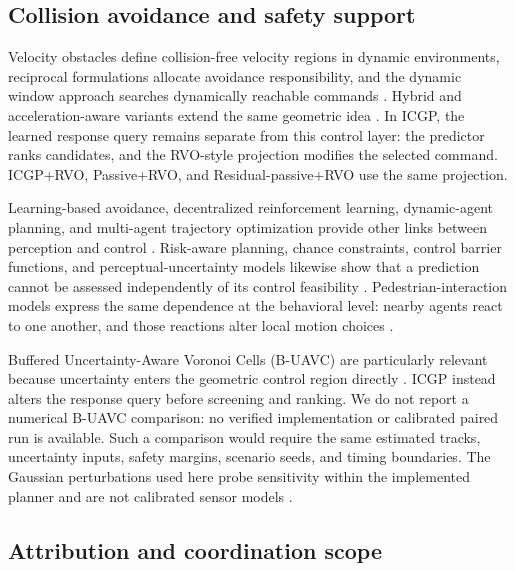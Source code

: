 \documentclass[pdflatex,sn-mathphys-num]{sn-jnl}
\begin{document}
\subsection{Collision avoidance and safety support}

Velocity obstacles define collision-free velocity regions in dynamic environments, reciprocal formulations allocate avoidance responsibility, and the dynamic window approach searches dynamically reachable commands \cite{fiorini1998,vandenberg2011,fox1997}. Hybrid and acceleration-aware variants extend the same geometric idea \cite{rvo2008,hrvo2009,avobstacles2011}. In ICGP, the learned response query remains separate from this control layer: the predictor ranks candidates, and the RVO-style projection modifies the selected command. ICGP+RVO, Passive+RVO, and Residual-passive+RVO use the same projection.

Learning-based avoidance, decentralized reinforcement learning, dynamic-agent planning, and multi-agent trajectory optimization provide other links between perception and control \cite{fan2020,behavior2014,long2018decentralized,everett2018dynamic,everett2021collision,kahn2018self,mader2022}. Risk-aware planning, chance constraints, control barrier functions, and perceptual-uncertainty models likewise show that a prediction cannot be assessed independently of its control feasibility \cite{paden2016survey,grigorescu2020survey,ames2019cbf,nyberg2021risk,pilania2015localization,dai2019chance,depetris2022risk,cao2025perceptual}. Pedestrian-interaction models express the same dependence at the behavioral level: nearby agents react to one another, and those reactions alter local motion choices \cite{karamouzas2014power,moussaid2010groups}.

Buffered Uncertainty-Aware Voronoi Cells (B-UAVC) are particularly relevant because uncertainty enters the geometric control region directly \cite{zhu2022}. ICGP instead alters the response query before screening and ranking. We do not report a numerical B-UAVC comparison: no verified implementation or calibrated paired run is available. Such a comparison would require the same estimated tracks, uncertainty inputs, safety margins, scenario seeds, and timing boundaries. The Gaussian perturbations used here probe sensitivity within the implemented planner and are not calibrated sensor models \cite{garg2024}.

\subsection{Attribution and coordination scope}
\end{document}
